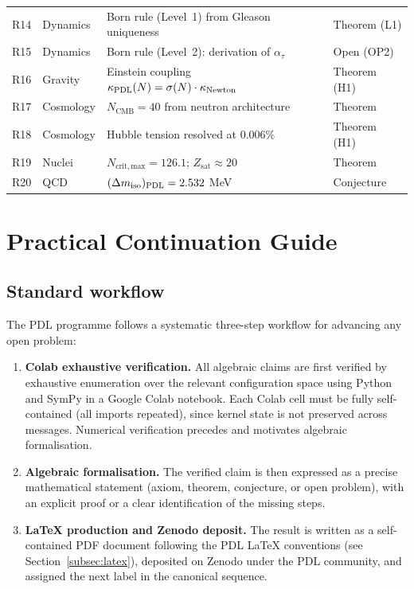 \documentclass[11pt,a4paper]{article}
\theoremstyle{plain}
\theoremstyle{definition}
\theoremstyle{remark}
\newcommand{\PDL}{\textnormal{PDL}}
\newcommand{\sigmaN}{\sigma(N)}
\begin{document}
\begin{longtable}{@{}L{0.7cm}L{2.5cm}L{6.5cm}L{2.5cm}@{}}
R14 & Dynamics & Born rule (Level~1) from Gleason uniqueness & \textcolor{proofblue}{Theorem (L1)} \\[0.3em]
R15 & Dynamics & Born rule (Level~2): derivation of $\alpha_\tau$ & \textcolor{openproblemred}{Open (OP2)} \\[0.3em]
R16 & Gravity & Einstein coupling $\kappa_{\PDL}(N)=\sigmaN\cdot\kappa_{\mathrm{Newton}}$ & \textcolor{proofblue}{Theorem (H1)} \\[0.3em]
R17 & Cosmology & $N_{\mathrm{CMB}}=40$ from neutron architecture & \textcolor{proofblue}{Theorem} \\[0.3em]
R18 & Cosmology & Hubble tension resolved at $0.006\%$ & \textcolor{proofblue}{Theorem (H1)} \\[0.3em]
R19 & Nuclei & $N_{\mathrm{crit,max}}=126.1$; $Z_{\mathrm{sat}}\approx 20$ & \textcolor{proofblue}{Theorem} \\[0.3em]
R20 & QCD & $(\Delta m_{\mathrm{iso}})_{\PDL}=2.532$ MeV & \textcolor{conjecturegreen}{Conjecture} \\[0.3em]

\end{longtable}

\section{Practical Continuation Guide}
\label{sec:continuation}

\subsection{Standard workflow}
\label{subsec:workflow}

The PDL programme follows a systematic three-step workflow for advancing any open problem:
\begin{enumerate}
\item \textbf{Colab exhaustive verification.}
All algebraic claims are first verified by exhaustive enumeration over the relevant configuration space using Python and SymPy in a Google Colab notebook.
Each Colab cell must be fully self-contained (all imports repeated), since kernel state is not preserved across messages.
Numerical verification precedes and motivates algebraic formalisation.
\item \textbf{Algebraic formalisation.}
The verified claim is then expressed as a precise mathematical statement (axiom, theorem, conjecture, or open problem), with an explicit proof or a clear identification of the missing steps.
\item \textbf{LaTeX production and Zenodo deposit.}
The result is written as a self-contained PDF document following the PDL LaTeX conventions (see Section~\ref{subsec:latex}), deposited on Zenodo under the PDL community, and assigned the next label in the canonical sequence.
\end{enumerate}
\end{document}

